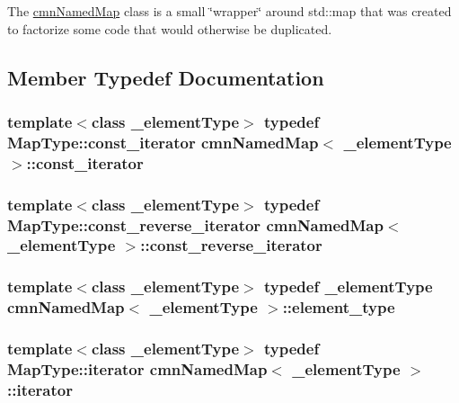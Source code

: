 The \hyperlink{classcmn_named_map}{cmn\-Named\-Map} class is a small \char`\"{}wrapper\char`\"{} around std\-::map that was created to factorize some code that would otherwise be duplicated. 

\subsection{Member Typedef Documentation}
\hypertarget{classcmn_named_map_a94a2be09d6678944e3a330c641d69d41}{
\subsubsection[{const\-\_\-iterator}]{\setlength{\rightskip}{0pt plus 5cm}template$<$class \-\_\-element\-Type$>$ typedef Map\-Type\-::const\-\_\-iterator {\bf cmn\-Named\-Map}$<$ \-\_\-element\-Type $>$\-::{\bf const\-\_\-iterator}}}\label{classcmn_named_map_a94a2be09d6678944e3a330c641d69d41}
\hypertarget{classcmn_named_map_ad32ba46e0f30a14d943acac6b229094c}{
\subsubsection[{const\-\_\-reverse\-\_\-iterator}]{\setlength{\rightskip}{0pt plus 5cm}template$<$class \-\_\-element\-Type$>$ typedef Map\-Type\-::const\-\_\-reverse\-\_\-iterator {\bf cmn\-Named\-Map}$<$ \-\_\-element\-Type $>$\-::{\bf const\-\_\-reverse\-\_\-iterator}}}\label{classcmn_named_map_ad32ba46e0f30a14d943acac6b229094c}
\hypertarget{classcmn_named_map_a04797ca34105e40893cf1bdbea391f32}{
\subsubsection[{element\-\_\-type}]{\setlength{\rightskip}{0pt plus 5cm}template$<$class \-\_\-element\-Type$>$ typedef \-\_\-element\-Type {\bf cmn\-Named\-Map}$<$ \-\_\-element\-Type $>$\-::{\bf element\-\_\-type}}}\label{classcmn_named_map_a04797ca34105e40893cf1bdbea391f32}
\hypertarget{classcmn_named_map_a0ad463b349c3c95e8f639e12f492765e}{
\subsubsection[{iterator}]{\setlength{\rightskip}{0pt plus 5cm}template$<$class \-\_\-element\-Type$>$ typedef Map\-Type\-::iterator {\bf cmn\-Named\-Map}$<$ \-\_\-element\-Type $>$\-::{\bf iterator}}}\label{classcmn_named_map_a0ad463b349c3c95e8f639e12f492765e}
